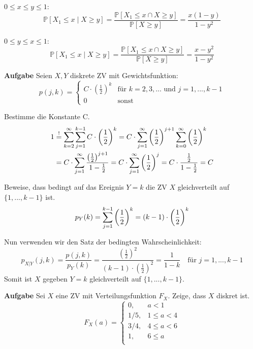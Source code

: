 $0 \leq x \leq y \leq 1$:
$$\mathbb{P}[X_1 \leq x \; | \; X \geq y] = \frac{\mathbb{P}[X_1 \leq x \cap X \geq y]}{\mathbb{P}[X \geq y]} = \frac{x(1-y)}{1 - y^2}$$

$0 \leq y \leq x \leq 1$:
$$\mathbb{P}[X_1 \leq x \; | \; X \geq y] = \frac{\mathbb{P}[X_1 \leq x \cap X \geq y]}{\mathbb{P}[X \geq y]} = \frac{x - y^2}{1 - y^2}$$

\hrulefill

\textbf{Aufgabe}
Seien $X,Y$ diskrete ZV mit Gewichtsfunktion:
$$p(j,k) = \begin{cases}
	C \cdot (\frac{1}{2})^k & \text{für } k = 2,3,... \text{ und } j = 1,...,k-1  \\
	0 & \text{sonst}
\end{cases}$$

Bestimme die Konstante C.
\begin{align*}
	1 &\stackrel{!}{=} \sum\limits_{k=2}^\infty \sum\limits_{j=1}^{k-1} C \cdot \left( \frac{1}{2} \right)^k = C \cdot \sum\limits_{j=1}^\infty \left( \frac{1}{2} \right)^{j+1} \sum\limits_{k=0}^\infty \left( \frac{1}{2} \right)^k \\
	&= C \cdot \sum\limits_{j=1}^\infty \frac{\left( \frac{1}{2} \right)^{j+1}}{1 - \frac{1}{2}} = C \cdot \sum\limits_{j=1}^\infty \left( \frac{1}{2} \right)^j = C \cdot \frac{\frac{1}{2}}{1 - \frac{1}{2}} = C
\end{align*}

Beweise, dass bedingt auf das Ereignis $Y = k$ die ZV $X$ gleichverteilt auf $\{ 1, ..., k-1 \}$ ist.
$$p_Y(k) = \sum\limits_{j=1}^{k-1} \left( \frac{1}{2} \right)^k = (k-1) \cdot \left( \frac{1}{2} \right)^k $$

Nun verwenden wir den Satz der bedingten Wahrscheinlichkeit:
$$p_{X|Y}(j, k) = \frac{p(j,k)}{p_Y(k)} = \frac{\left( \frac{1}{2} \right)^2}{(k-1) \cdot \left( \frac{1}{2} \right)^2} = \frac{1}{1 - k} \quad \text{für } j = 1,...,k-1$$
Somit ist $X$ gegeben $Y = k$ gleichverteilt auf $\{ 1, ..., k-1 \}$.

\hrulefill




\textbf{Aufgabe}
Sei $X$ eine ZV mit Verteilungsfunktion $F_X$. Zeige, dass $X$ diskret ist.
$$ F_X(a) = \begin{cases}
	0, 		& a < 1 \\
	1/5, 	& 1 \leq a < 4 \\
	3/4, 	& 4 \leq a < 6 \\
	1, 		& 6 \leq a \\
\end{cases}$$ \medskip

